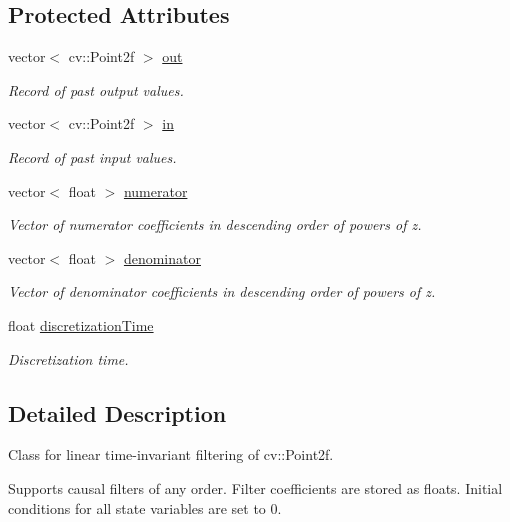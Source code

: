 \subsection*{\-Protected \-Attributes}
\begin{DoxyCompactItemize}
\item 
vector$<$ cv\-::\-Point2f $>$ \hyperlink{classLTIFilter_a7e0e6a2458dfbe2c59e39f9a86d89f97}{out}
\begin{DoxyCompactList}\small\item\em \-Record of past output values. \end{DoxyCompactList}\item 
vector$<$ cv\-::\-Point2f $>$ \hyperlink{classLTIFilter_a88e509896075deb20014a50bd1fb8ad3}{in}
\begin{DoxyCompactList}\small\item\em \-Record of past input values. \end{DoxyCompactList}\item 
vector$<$ float $>$ \hyperlink{classLTIFilter_a974499baf5e9e72be47fad7102378799}{numerator}
\begin{DoxyCompactList}\small\item\em \-Vector of numerator coefficients in descending order of powers of z. \end{DoxyCompactList}\item 
vector$<$ float $>$ \hyperlink{classLTIFilter_a512a56c05c4012f9249792710961ab65}{denominator}
\begin{DoxyCompactList}\small\item\em \-Vector of denominator coefficients in descending order of powers of z. \end{DoxyCompactList}\item 
float \hyperlink{classLTIFilter_a25aebaf813e6c12a0acaaeaed6780b80}{discretization\-Time}
\begin{DoxyCompactList}\small\item\em \-Discretization time. \end{DoxyCompactList}\end{DoxyCompactItemize}


\subsection{\-Detailed \-Description}
\-Class for linear time-\/invariant filtering of cv\-::\-Point2f. 

\-Supports causal filters of any order. \-Filter coefficients are stored as floats. \-Initial conditions for all state variables are set to 0. 

